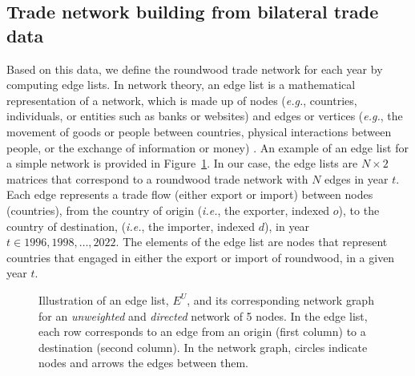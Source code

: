 \documentclass[
  authoryear,
  review,
  3p]{elsarticle}
\begin{document}
\subsection{Trade network building from bilateral trade
data}\label{trade-network-building-from-bilateral-trade-data}

Based on this data, we define the roundwood trade network for each year
by computing edge lists. In network theory, an edge list is a
mathematical representation of a network, which is made up of nodes
(\emph{e.g.}, countries, individuals, or entities such as banks or
websites) and edges or vertices (\emph{e.g.}, the movement of goods or
people between countries, physical interactions between people, or the
exchange of information or money)
\citep{albert_statistical_2002, newman_structure_2003}. An example of an
edge list for a simple network is provided in
Figure~\ref{fig-edge-list-unweighted}. In our case, the edge lists are
\(N \times 2\) matrices that correspond to a roundwood trade network
with \(N\) edges in year \(t\). Each edge represents a trade flow
(either export or import) between nodes (countries), from the country of
origin (\emph{i.e.}, the exporter, indexed \(o\)), to the country of
destination, (\emph{i.e.}, the importer, indexed \(d\)), in year
\(t \in {1996,1998,…,2022}\). The elements of the edge list are nodes
that represent countries that engaged in either the export or import of
roundwood, in a given year \(t\).

\begin{figure}[t]


\caption{\label{fig-edge-list-unweighted}Illustration of an edge list,
\(E^U\), and its corresponding network graph for an \textit{unweighted}
and \textit{directed} network of 5 nodes. In the edge list, each row
corresponds to an edge from an origin (first column) to a destination
(second column). In the network graph, circles indicate nodes and arrows
the edges between them.}

\end{figure}%
\end{document}

